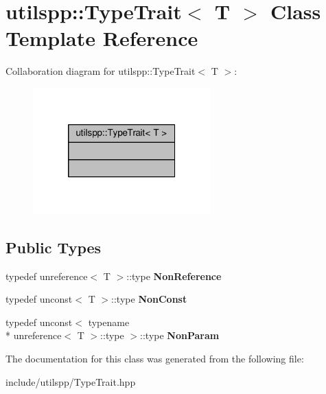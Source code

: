 \hypertarget{classutilspp_1_1TypeTrait}{\section{utilspp\-:\-:Type\-Trait$<$ T $>$ Class Template Reference}
\label{classutilspp_1_1TypeTrait}
}


Collaboration diagram for utilspp\-:\-:Type\-Trait$<$ T $>$\-:\nopagebreak
\begin{figure}[H]
\begin{center}
\leavevmode
\includegraphics[width=194pt]{classutilspp_1_1TypeTrait__coll__graph}
\end{center}
\end{figure}
\subsection*{Public Types}
\begin{DoxyCompactItemize}
\item 
\hypertarget{classutilspp_1_1TypeTrait_afbee8025768eed8ae5a108e4f1f108c2}{typedef unreference$<$ T $>$\-::type {\bfseries Non\-Reference}}\label{classutilspp_1_1TypeTrait_afbee8025768eed8ae5a108e4f1f108c2}

\item 
\hypertarget{classutilspp_1_1TypeTrait_a31673fb504aa9bc8382c3da39279b6fe}{typedef unconst$<$ T $>$\-::type {\bfseries Non\-Const}}\label{classutilspp_1_1TypeTrait_a31673fb504aa9bc8382c3da39279b6fe}

\item 
\hypertarget{classutilspp_1_1TypeTrait_ae94576b46bc786ddb9465b9ba1eedca2}{typedef unconst$<$ typename \\*
unreference$<$ T $>$\-::type $>$\-::type {\bfseries Non\-Param}}\label{classutilspp_1_1TypeTrait_ae94576b46bc786ddb9465b9ba1eedca2}

\end{DoxyCompactItemize}


The documentation for this class was generated from the following file\-:\begin{DoxyCompactItemize}
\item 
include/utilspp/Type\-Trait.\-hpp\end{DoxyCompactItemize}
